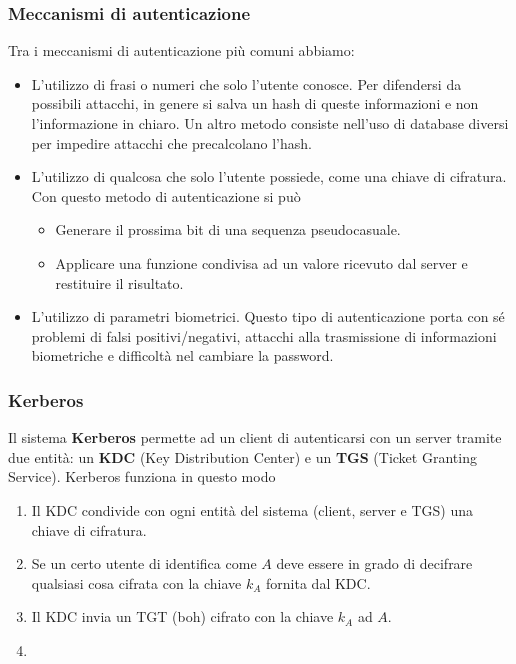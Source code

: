 \subsubsection{Meccanismi di autenticazione}
Tra i meccanismi di autenticazione più comuni abbiamo:
\begin{itemize}
	\item L'utilizzo di frasi o numeri che solo l'utente conosce. Per difendersi da possibili attacchi, in genere si
	      salva un hash di queste informazioni e non l'informazione in chiaro. Un altro metodo consiste nell'uso di
	      database diversi per impedire attacchi che precalcolano l'hash.
	\item L'utilizzo di qualcosa che solo l'utente possiede, come una chiave di cifratura. Con questo metodo di
	      autenticazione si può
	      \begin{itemize}
		      \item Generare il prossima bit di una sequenza pseudocasuale.
		      \item Applicare una funzione condivisa ad un valore ricevuto dal server e restituire il risultato.
	      \end{itemize}
	\item L'utilizzo di parametri biometrici. Questo tipo di autenticazione porta con sé problemi di falsi
	      positivi/negativi, attacchi alla trasmissione di informazioni biometriche e difficoltà nel cambiare la
	      password.
\end{itemize}

\subsubsection{Kerberos}
Il sistema \textbf{Kerberos} permette ad un client di autenticarsi con un server tramite due entità: un \textbf{KDC}
(Key Distribution Center) e un \textbf{TGS}	(Ticket Granting Service). Kerberos funziona in questo modo
\begin{enumerate}
	\item Il KDC condivide con ogni entità del sistema (client, server e TGS) una chiave di cifratura.
	\item Se un certo utente di identifica come $A$ deve essere in grado di decifrare qualsiasi cosa cifrata
	      con la chiave $k_A$ fornita dal KDC.
	\item Il KDC invia un TGT (boh) cifrato con la chiave $k_A$ ad $A$.
	\item
\end{enumerate}